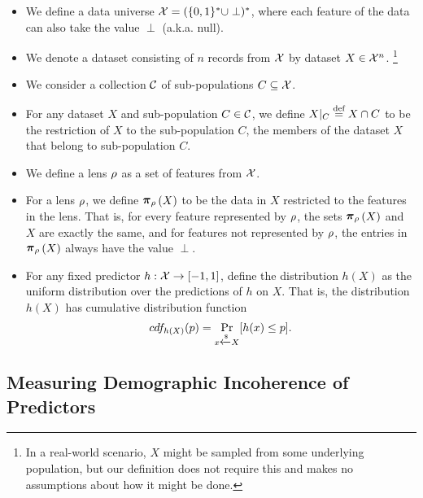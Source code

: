 \ifnum{}
\begin{itemize}[leftmargin=*,itemsep=0pt]
\else
\begin{itemize}
\fi
    \item We define a data universe $\mathcal{X} = (\{0,1\}^* \cup \perp)^*$, where each feature of the data can also take the value $\perp$ (a.k.a. null).
    
    \item We denote a dataset consisting of $n$ records from $\mathcal{X}$ by dataset $X \in \mathcal{X}^n$. \footnote{In a real-world scenario, $X$ might be sampled from some underlying population, but our definition does not require this and makes no assumptions about how it might be done.}

    \item We consider a collection $\mathcal{C}$ of sub-populations $C \subseteq \mathcal{X}$.

    \item For any dataset $X$ and sub-population $C \in \mathcal{C}$, we define $X|_C \stackrel{\text{def}}{=} X \cap C$ to be the restriction of $X$ to the sub-population $C$, \ie the members of the dataset $X$ that belong to sub-population $C$. 

    \item We define a lens $\rho$ as a set of features from $\mathcal{X}$.
    
    \item For a lens $\rho$, we define $\restrict{X}{\selection}$ to be the data in $X$ restricted to the features in the lens. That is, for every feature represented by $\rho$, the sets $\restrict{X}{\selection}$ and $X$ are exactly the same, and for features not represented by $\rho$, the entries in $\restrict{X}{\selection}$ always have the value $\perp$. 
    
    \item For any fixed predictor $h: \mathcal{X} \to [-1,1]$, define the distribution $h(X)$ as the uniform distribution over the predictions of $h$ on $X$. That is, the distribution $h(X)$ has cumulative distribution function
    $$cdf_{h(X)}(p) = \underset{x \xleftarrow{\$} X}{\Pr}[h(x) \leq p].$$
\end{itemize}

\subsection{Measuring Demographic Incoherence of Predictors}\label{sec:def-incoherent-predictor}



\end{itemize}
